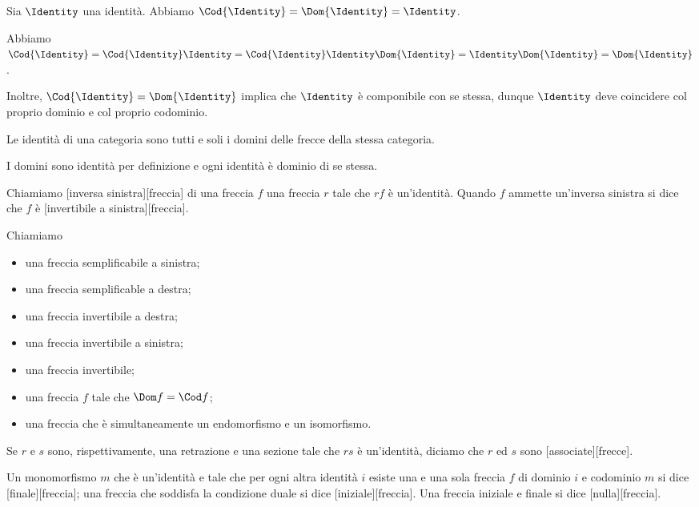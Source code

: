 \begin{Theorem}
	Sia $\Identity$ una identit\`a. Abbiamo $\Cod{\Identity} =
	\Dom{\Identity} = \Identity$.
\end{Theorem}
\Proof Abbiamo $\Cod{\Identity} = \Cod{\Identity} \Identity =
\Cod{\Identity} \Identity \Dom{\Identity} =
\Identity \Dom{\Identity} = \Dom{\Identity}$.
\par Inoltre, $\Cod{\Identity} = \Dom{\Identity}$ implica che
$\Identity$ \`e componibile con se stessa, dunque $\Identity$ deve
coincidere col proprio dominio e col proprio codominio. \EndProof
\begin{Corollary}
	Le identit\`a di una categoria sono tutti e soli i domini delle frecce della stessa categoria. 
\end{Corollary}
\Proof I domini sono identit\`a per definizione e ogni identit\`a \`e dominio di se stessa. \EndProof
\begin{Definition}
	Chiamiamo [inversa sinistra][freccia] di una freccia $f$ una freccia $r$ tale che $rf$ \`e un'identit\`a. Quando $f$ ammette un'inversa sinistra si dice che $f$ \`e [invertibile a sinistra][freccia].
\end{Definition}
\begin{Definition}
	Chiamiamo
	\begin{itemize}
		\item {} una freccia semplificabile a sinistra;
		\item {} una freccia semplificable a destra;
		\item {} una freccia invertibile a destra;
		\item {} una freccia invertibile a sinistra;
		\item {} una freccia invertibile;
		\item {} una freccia $f$ tale che $\Dom f = \Cod f$;
		\item {} una freccia che \`e simultaneamente un endomorfismo e un isomorfismo.
	\end{itemize}
	Se $r$ e $s$ sono, rispettivamente, una retrazione e una sezione tale che $rs$ \`e un'identit\`a, diciamo che $r$ ed $s$ sono [associate][frecce].
\end{Definition}
\begin{Definition}
	Un monomorfismo $m$ che \`e un'identit\`a e tale che per ogni altra identit\`a $i$ esiste una e una sola freccia $f$ di dominio $i$ e codominio $m$ si dice [finale][freccia]; una freccia che soddisfa la condizione duale si dice [iniziale][freccia]. Una freccia iniziale e finale si dice [nulla][freccia].
\end{Definition}
